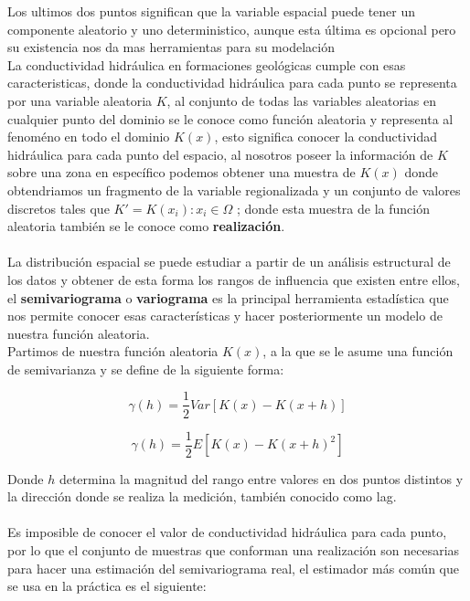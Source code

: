 Los ultimos dos puntos significan que la variable espacial puede tener un componente aleatorio y uno deterministico, aunque esta última es opcional pero su existencia nos da mas herramientas para su modelación
\\

La conductividad hidráulica en formaciones geológicas cumple con esas caracteristicas, donde la conductividad hidráulica para cada punto se representa por una variable aleatoria $K$, al conjunto de todas las variables aleatorias en cualquier punto del dominio se le conoce como función aleatoria y representa  al fenoméno en todo el dominio $K(x)$, esto significa conocer la conductividad hidráulica para cada punto del espacio, al nosotros poseer la información de $K$ sobre una zona en específico podemos obtener una muestra de $K(x)$ donde obtendriamos un fragmento de la variable regionalizada y un conjunto de valores discretos tales que $K'={K(x_{i}): x_{i}\in\Omega}$ ; donde esta muestra de la función aleatoria también se le conoce como \textbf{realización}.
\\
\\
La distribución espacial se puede estudiar a partir de un análisis estructural de los datos y obtener de esta forma los rangos de influencia que existen entre ellos, el \textbf{semivariograma} o \textbf{variograma} es la principal herramienta estadística que nos permite conocer esas características y hacer posteriormente un modelo de nuestra función aleatoria.
\\

Partimos de nuestra función aleatoria $K(x)$, a la que se le asume una función de semivarianza y se define de la siguiente forma:

\begin{equation}
\label{eq:Phi14a}
\gamma(h)=\dfrac{1}{2}Var[K(x)-K(x+h)]
\end{equation}

\begin{equation}
\label{eq:Phi14}
\gamma(h)=\dfrac{1}{2}E[{K(x)-K(x+h)}^{2}]
\end{equation}

Donde $h$ determina la magnitud del rango entre valores en dos puntos distintos y la dirección donde se realiza la medición, también conocido como lag.
\\
\\
Es imposible de conocer el valor de conductividad hidráulica para cada punto, por lo que el conjunto de muestras que conforman una realización son necesarias para hacer una estimación del semivariograma real, el estimador más común que se usa en la práctica es el siguiente:

